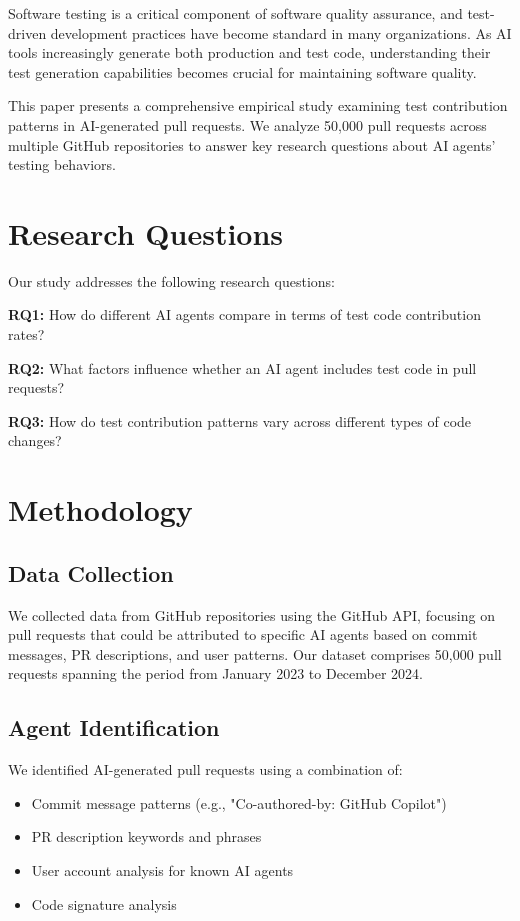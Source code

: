 \documentclass[conference]{IEEEtran}
\begin{document}
Software testing is a critical component of software quality assurance, and test-driven development practices have become standard in many organizations. As AI tools increasingly generate both production and test code, understanding their test generation capabilities becomes crucial for maintaining software quality.

This paper presents a comprehensive empirical study examining test contribution patterns in AI-generated pull requests. We analyze 50,000 pull requests across multiple GitHub repositories to answer key research questions about AI agents' testing behaviors.

\section{Research Questions}

Our study addresses the following research questions:

\textbf{RQ1:} How do different AI agents compare in terms of test code contribution rates?

\textbf{RQ2:} What factors influence whether an AI agent includes test code in pull requests?

\textbf{RQ3:} How do test contribution patterns vary across different types of code changes?

\section{Methodology}

\subsection{Data Collection}

We collected data from GitHub repositories using the GitHub API, focusing on pull requests that could be attributed to specific AI agents based on commit messages, PR descriptions, and user patterns. Our dataset comprises 50,000 pull requests spanning the period from January 2023 to December 2024.

\subsection{Agent Identification}

We identified AI-generated pull requests using a combination of:
\begin{itemize}
    \item Commit message patterns (e.g., "Co-authored-by: GitHub Copilot")
    \item PR description keywords and phrases
    \item User account analysis for known AI agents
    \item Code signature analysis
\end{itemize}
\end{document}
